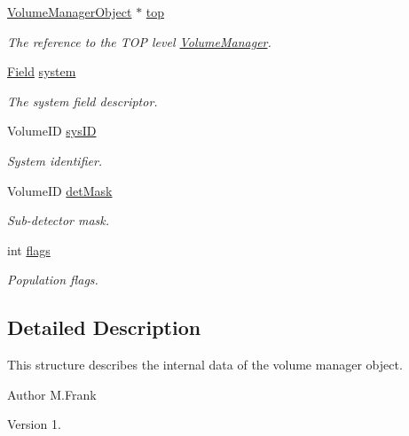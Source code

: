 \begin{DoxyCompactItemize}
\hyperlink{class_d_d4hep_1_1_geometry_1_1_volume_manager_object}{Volume\+Manager\+Object} $\ast$ \hyperlink{class_d_d4hep_1_1_geometry_1_1_volume_manager_object_a2488dfe57afee14dd92f5f30a03f827f}{top}
\begin{DoxyCompactList}\small\item\em The reference to the T\+OP level \hyperlink{class_d_d4hep_1_1_geometry_1_1_volume_manager}{Volume\+Manager}. \end{DoxyCompactList}\item 
\hyperlink{class_d_d4hep_1_1_geometry_1_1_volume_manager_object_ab214e2fe7df311a4a2e87ec17958790c}{Field} \hyperlink{class_d_d4hep_1_1_geometry_1_1_volume_manager_object_ab53feb861c1eef621fbdb6350df70db0}{system}
\begin{DoxyCompactList}\small\item\em The system field descriptor. \end{DoxyCompactList}\item 
Volume\+ID \hyperlink{class_d_d4hep_1_1_geometry_1_1_volume_manager_object_a52c95661de580da96a5585da48064e58}{sys\+ID}
\begin{DoxyCompactList}\small\item\em System identifier. \end{DoxyCompactList}\item 
Volume\+ID \hyperlink{class_d_d4hep_1_1_geometry_1_1_volume_manager_object_aee03c6af6623d5d678c7cb870021e974}{det\+Mask}
\begin{DoxyCompactList}\small\item\em Sub-\/detector mask. \end{DoxyCompactList}\item 
int \hyperlink{class_d_d4hep_1_1_geometry_1_1_volume_manager_object_abe994d6c29e62e21c1fd2d2be21d041d}{flags}
\begin{DoxyCompactList}\small\item\em Population flags. \end{DoxyCompactList}\end{DoxyCompactItemize}


\subsection{Detailed Description}
This structure describes the internal data of the volume manager object. 

\begin{DoxyAuthor}{Author}
M.\+Frank 
\end{DoxyAuthor}
\begin{DoxyVersion}{Version}
1. 
\end{DoxyVersion}


